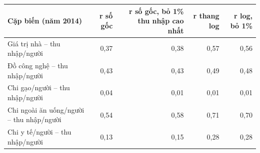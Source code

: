 \begin{tabular}{lrrrr}
\toprule
Cặp biến (năm 2014) & r số gốc & r số gốc, bỏ 1\% thu nhập cao nhất & r thang log & r log, bỏ 1\% \\
\midrule
Giá trị nhà – thu nhập/người & 0,37 & 0,38 & 0,57 & 0,56 \\
Đồ công nghệ – thu nhập/người & 0,43 & 0,43 & 0,49 & 0,48 \\
Chi gạo/người – thu nhập/người & 0,04 & 0,01 & 0,01 & 0,01 \\
Chi ngoài ăn uống/người – thu nhập/người & 0,54 & 0,58 & 0,71 & 0,70 \\
Chi y tế/người – thu nhập/người & 0,13 & 0,15 & 0,28 & 0,28 \\
\bottomrule
\end{tabular}
